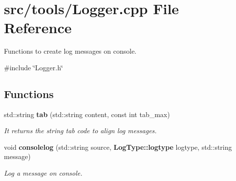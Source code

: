 \section{src/tools/\+Logger.cpp File Reference}
\label{_logger_8cpp}


Functions to create log messages on console.  


{\ttfamily \#include \char`\"{}Logger.\+h\char`\"{}}\newline
\subsection*{Functions}
\begin{DoxyCompactItemize}
\item 
std\+::string \textbf{ tab} (std\+::string content, const int tab\+\_\+max)
\begin{DoxyCompactList}\small\item\em It returns the string tab code to align log messages. \end{DoxyCompactList}\item 
void \textbf{ consolelog} (std\+::string source, \textbf{ Log\+Type\+::logtype} logtype, std\+::string message)
\begin{DoxyCompactList}\small\item\em Log a message on console. \end{DoxyCompactList}\end{DoxyCompactItemize}
